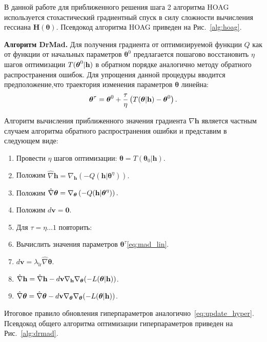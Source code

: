 В данной работе для приближенного решения  шага 2 алгоритма HOAG используется стохастический градиентный спуск в силу сложности вычисления гессиана $\mathbf{H}(\boldsymbol{\theta})$.
Псевдокод алгоритма HOAG приведен на Рис.~\ref{alg:hoag}.

\textbf{Алгоритм DrMad. }
Для получения градиента от оптимизируемой функции $Q$ как от функции от начальных параметров $\boldsymbol{\theta}^0$ предлагается пошагово восстановить $\eta$ шагов оптимизации $T(\boldsymbol{\theta}^0|\mathbf{h})$ в обратном порядке аналогично методу обратного распространения ошибок. Для упрощения данной процедуры вводится предположение,что траектория изменения параметров $\boldsymbol{\theta}$ линейна:
\begin{equation}
\label{eq:mad_lin}
\boldsymbol{\theta}^\tau = \boldsymbol{\theta}^0 + \frac{\tau}{\eta} \left(T(\boldsymbol{\theta}|\mathbf{h})- \boldsymbol{\theta}^0\right).
\end{equation}

Алгоритм вычисления приближенного значения градиента $\nabla \mathbf{h}$ является частным случаем алгоритма обратного распространения ошибки и представим в следующем виде:
\begin{enumerate}
\item Провести $\eta$ шагов оптимизации: $\boldsymbol{\theta} = T(\boldsymbol{\theta}_0| \mathbf{h})$.
\item Положим $\hat{\nabla} \mathbf{h} = \nabla_\mathbf{h} \left(-Q( \mathbf{h}| {\boldsymbol{\theta}}^\eta)\right).$
\item Положим $\hat{\nabla} \boldsymbol{\theta} = \nabla_{\boldsymbol{\theta}} \left(-Q( \mathbf{h}| {\boldsymbol{\theta}}^\eta)\right).$  
\item Положим $d\mathbf{v} = \mathbf{0}.$
\item Для $\tau = \eta \dots 1 $ повторить:
\item Вычислить значения параметров $\boldsymbol{\theta}^\tau$\eqref{eq:mad_lin}.
\item $d\mathbf{v} =   \lambda_{\text{lr}} \hat{\nabla} {\boldsymbol{\theta}}$.
\item $\hat{\nabla} \mathbf{h} =  \hat{\nabla} \mathbf{h} - d\mathbf{v}\nabla_{\mathbf{h}} \nabla_{\boldsymbol{\theta}} (-L(\boldsymbol{\theta}|\mathbf{h}))$.
\item $\hat{\nabla} \boldsymbol{\theta}  = \hat{\nabla} \boldsymbol{\theta}  - d\mathbf{v}\nabla_{\boldsymbol{\theta}} \nabla_{\boldsymbol{\theta}} (-L(\boldsymbol{\theta}|\mathbf{h}))$.
\end{enumerate}

Итоговое правило обновления гиперпараметров аналогично~\eqref{eq:update_hyper}.
Псевдокод общего алгоритма оптимизации гиперпараметров приведен на Рис.~\ref{alg:drmad}.

